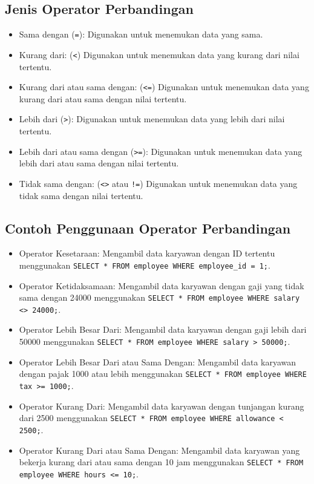 \documentclass{article}
\begin{document}
\subsection{Jenis Operator Perbandingan}
\begin{itemize}
    \item Sama dengan (\texttt{=}): Digunakan untuk menemukan data yang sama.
    \item Kurang dari: (\texttt{<}) Digunakan untuk menemukan data yang kurang dari nilai tertentu.
    \item Kurang dari atau sama dengan: (\texttt{<=}) Digunakan untuk menemukan data yang kurang dari atau sama dengan nilai tertentu.
    \item Lebih dari (\texttt{>}): Digunakan untuk menemukan data yang lebih dari nilai tertentu.
    \item Lebih dari atau sama dengan (\texttt{>=}): Digunakan untuk menemukan data yang lebih dari atau sama dengan nilai tertentu.
    \item Tidak sama dengan: (\texttt{<>} atau \texttt{!=}) Digunakan untuk menemukan data yang tidak sama dengan nilai tertentu.
\end{itemize}

\subsection{Contoh Penggunaan Operator Perbandingan}
\begin{itemize}
    \item Operator Kesetaraan: Mengambil data karyawan dengan ID tertentu menggunakan \texttt{SELECT * FROM employee WHERE employee\_id = 1;}.
    \item Operator Ketidaksamaan: Mengambil data karyawan dengan gaji yang tidak sama dengan 24000 menggunakan \texttt{SELECT * FROM employee WHERE salary <> 24000;}.
    \item Operator Lebih Besar Dari: Mengambil data karyawan dengan gaji lebih dari 50000 menggunakan \texttt{SELECT * FROM employee WHERE salary > 50000;}.
    \item Operator Lebih Besar Dari atau Sama Dengan: Mengambil data karyawan dengan pajak 1000 atau lebih menggunakan \texttt{SELECT * FROM employee WHERE tax >= 1000;}.
    \item Operator Kurang Dari: Mengambil data karyawan dengan tunjangan kurang dari 2500 menggunakan \texttt{SELECT * FROM employee WHERE allowance < 2500;}.
    \item Operator Kurang Dari atau Sama Dengan: Mengambil data karyawan yang bekerja kurang dari atau sama dengan 10 jam menggunakan \texttt{SELECT * FROM employee WHERE hours <= 10;}.
\end{itemize}
\end{document}
